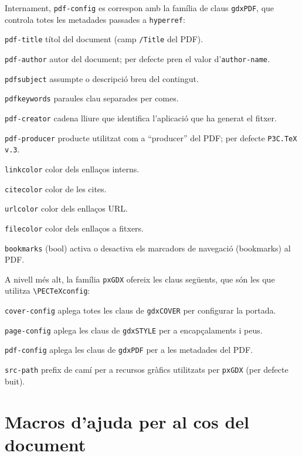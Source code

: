 \documentclass[11pt,a4paper]{article}
\begin{document}
Internament, \verb|pdf-config| es correspon amb la família de claus
\verb|gdxPDF|, que controla totes les metadades passades a
\texttt{hyperref}:

\begin{description}
  \item{\verb|pdf-title|} títol del document (camp \texttt{/Title} del
    PDF).
  \item{\verb|pdf-author|} autor del document; per defecte pren el
    valor d'\verb|author-name|.
  \item{\verb|pdfsubject|} assumpte o descripció breu del contingut.
  \item{\verb|pdfkeywords|} paraules clau separades per comes.
  \item{\verb|pdf-creator|} cadena lliure que identifica l'aplicació
    que ha generat el fitxer.
  \item{\verb|pdf-producer|} producte utilitzat com a ``producer'' del
    PDF; per defecte \verb|P3C.TeX v.3|.
  \item{\verb|linkcolor|} color dels enllaços interns.
  \item{\verb|citecolor|} color de les cites.
  \item{\verb|urlcolor|} color dels enllaços URL.
  \item{\verb|filecolor|} color dels enllaços a fitxers.
  \item{\verb|bookmarks| (bool)} activa o desactiva els marcadors de
    navegació (bookmarks) al PDF.
\end{description}

A nivell més alt, la família \verb|pxGDX| ofereix les claus següents,
que són les que utilitza \verb|\PECTeXconfig|:

\begin{description}
  \item{\verb|cover-config|} aplega totes les claus de \verb|gdxCOVER|
    per configurar la portada.
  \item{\verb|page-config|} aplega les claus de \verb|gdxSTYLE| per a
    encapçalaments i peus.
  \item{\verb|pdf-config|} aplega les claus de \verb|gdxPDF| per a les
    metadades del PDF.
  \item{\verb|src-path|} prefix de camí per a recursos gràfics
    utilitzats per \texttt{pxGDX} (per defecte buit).
\end{description}

\section{Macros d'ajuda per al cos del document}
\end{document}
